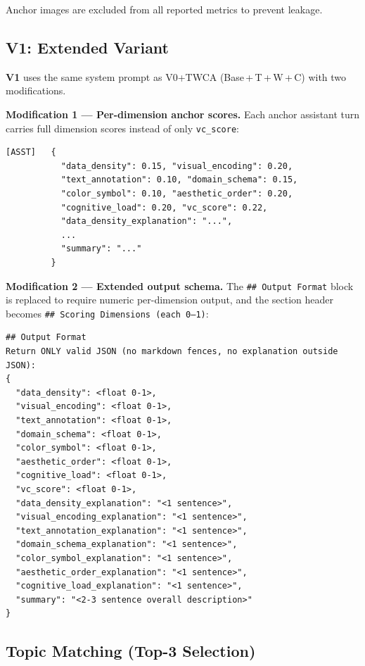 \noindent Anchor images are excluded from all reported metrics to
prevent leakage.

\subsection{V1: Extended Variant}
\label{app:prompts-v1}

\textbf{V1} uses the same system prompt as V0+TWCA (Base\,+\,T\,+\,W\,+\,C)
with two modifications.

\textbf{Modification 1 --- Per-dimension anchor scores.} Each anchor
assistant turn carries full dimension scores instead of only
\texttt{vc\_score}:

\begin{lstlisting}
[ASST]   {
           "data_density": 0.15, "visual_encoding": 0.20,
           "text_annotation": 0.10, "domain_schema": 0.15,
           "color_symbol": 0.10, "aesthetic_order": 0.20,
           "cognitive_load": 0.20, "vc_score": 0.22,
           "data_density_explanation": "...",
           ...
           "summary": "..."
         }
\end{lstlisting}

\textbf{Modification 2 --- Extended output schema.} The
\texttt{\#\#~Output~Format} block is replaced to require numeric
per-dimension output, and the section header becomes
\texttt{\#\#~Scoring~Dimensions~(each~0--1)}:

\begin{lstlisting}
## Output Format
Return ONLY valid JSON (no markdown fences, no explanation outside JSON):
{
  "data_density": <float 0-1>,
  "visual_encoding": <float 0-1>,
  "text_annotation": <float 0-1>,
  "domain_schema": <float 0-1>,
  "color_symbol": <float 0-1>,
  "aesthetic_order": <float 0-1>,
  "cognitive_load": <float 0-1>,
  "vc_score": <float 0-1>,
  "data_density_explanation": "<1 sentence>",
  "visual_encoding_explanation": "<1 sentence>",
  "text_annotation_explanation": "<1 sentence>",
  "domain_schema_explanation": "<1 sentence>",
  "color_symbol_explanation": "<1 sentence>",
  "aesthetic_order_explanation": "<1 sentence>",
  "cognitive_load_explanation": "<1 sentence>",
  "summary": "<2-3 sentence overall description>"
}
\end{lstlisting}

\subsection{Topic Matching (Top-3 Selection)}
\label{app:prompts-topic}

